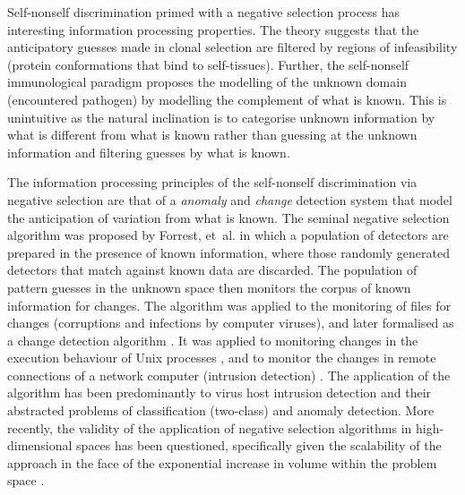 Self-nonself discrimination primed with a negative selection process has interesting information processing properties. The theory suggests that the anticipatory guesses made in clonal selection are filtered by regions of infeasibility (protein conformations that bind to self-tissues). Further, the self-nonself immunological paradigm proposes the modelling of the unknown domain (encountered pathogen) by modelling the complement of what is known. This is unintuitive as the natural inclination is to categorise unknown information by what is different from what is known rather than guessing at the unknown information and filtering guesses by what is known. 

The information processing principles of the self-nonself discrimination via negative selection are that of a \emph{anomaly} and \emph{change} detection system that model the anticipation of variation from what is known. The seminal negative selection algorithm was proposed by Forrest, et~al. \cite{Forrest1994a} in which a population of detectors are prepared in the presence of known information, where those randomly generated detectors that match against known data are discarded. The population of pattern guesses in the unknown space then monitors the corpus of known information for changes. The algorithm was applied to the monitoring of files for changes (corruptions and infections by computer viruses), and later formalised as a change detection algorithm \cite{D'haeseleer1996a, D'haeseleer1996}. It was applied to monitoring changes in the execution behaviour of Unix processes \cite{Forrest1996, Hofmeyr1998}, and to monitor the changes in remote connections of a network computer (intrusion detection) \cite{Hofmeyr1999, Hofmeyr1999a}. The application of the algorithm has been predominantly to virus host intrusion detection and their abstracted problems of classification (two-class) and anomaly detection.
More recently, the validity of the application of negative selection algorithms in high-dimensional spaces has been questioned, specifically given the scalability of the approach in the face of the exponential increase in volume within the problem space \cite{Stibor2006}.

%
%
